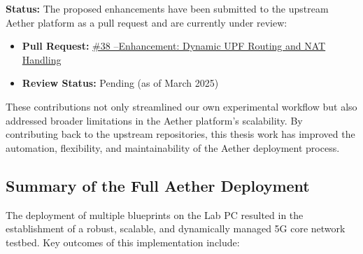 \textbf{Status:} The proposed enhancements have been submitted to the upstream Aether platform as a pull request and are currently under review:
\begin{itemize}
    \item \textbf{Pull Request:} \href{https://github.com/opennetworkinglab/aether-5gc/pull/38}{\#38 –Enhancement: Dynamic UPF Routing and NAT Handling}
    \item \textbf{Review Status:} Pending (as of March 2025)
\end{itemize}

\medskip

These contributions not only streamlined our own experimental workflow but also addressed broader limitations in the Aether platform’s scalability. By contributing back to the upstream repositories, this thesis work has improved the automation, flexibility, and maintainability of the Aether deployment process.


\subsection{Summary of the Full Aether Deployment}

The deployment of multiple blueprints on the Lab PC resulted in the establishment of a robust, scalable, and dynamically managed 5G core network testbed. Key outcomes of this implementation include:

